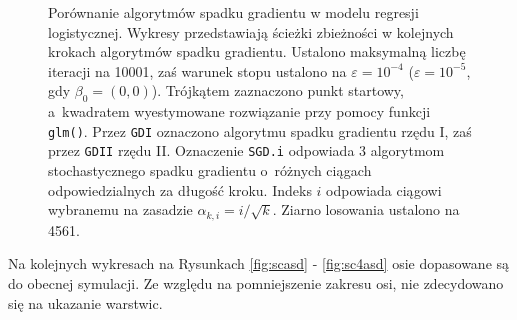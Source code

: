 \begin{figure}[h!]
\begin{center}
\end{center}
\caption{\label{fig:sc5asd} Porównanie algorytmów spadku gradientu w modelu regresji logistycznej. Wykresy przedstawiają ścieżki zbieżności w kolejnych krokach algorytmów spadku gradientu. Ustalono maksymalną liczbę iteracji na 10001, zaś warunek stopu ustalono na $\varepsilon=10^{-4}$ ($\varepsilon=10^{-5}$, gdy $\beta_0 = (0,0)$). Trójkątem zaznaczono punkt startowy, a~kwadratem wyestymowane rozwiązanie przy pomocy funkcji \texttt{glm()}. Przez \texttt{GDI} oznaczono algorytmu spadku gradientu rzędu I, zaś przez \texttt{GDII} rzędu II. Oznaczenie \texttt{SGD.i} odpowiada 3 algorytmom stochastycznego spadku gradientu o~różnych ciągach odpowiedzialnych za długość kroku. Indeks $i$ odpowiada ciągowi wybranemu na zasadzie $\alpha_{k,i} = i/\sqrt{k}$. Ziarno losowania ustalono na 4561.}
\end{figure}

Na kolejnych wykresach na Rysunkach \ref{fig:scasd} - \ref{fig:sc4asd} osie dopasowane są do obecnej symulacji. Ze względu na pomniejszenie zakresu osi, nie zdecydowano się na ukazanie warstwic.

\newpage

